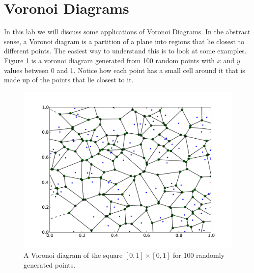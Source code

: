 \label{lab:voronoi}


\section*{Voronoi Diagrams}

In this lab we will discuss some applications of Voronoi Diagrams.
In the abstract sense, a Voronoi diagram is a partition of a plane into regions that lie closest to different points.
The easiest way to understand this is to look at some examples.
Figure \ref{voronoi_ex_1} is a voronoi diagram generated from 100 random points with $x$ and $y$ values between 0 and 1.
Notice how each point has a small  cell around it that is made up of the points that lie closest to it.

\begin{figure}
\includegraphics[width=\textwidth]{voronoi_example_1.pdf}
\caption{A Voronoi diagram of the square $[0,1]\times [0,1]$ for 100 randomly generated points.}
\label{voronoi_ex_1}
\end{figure}


